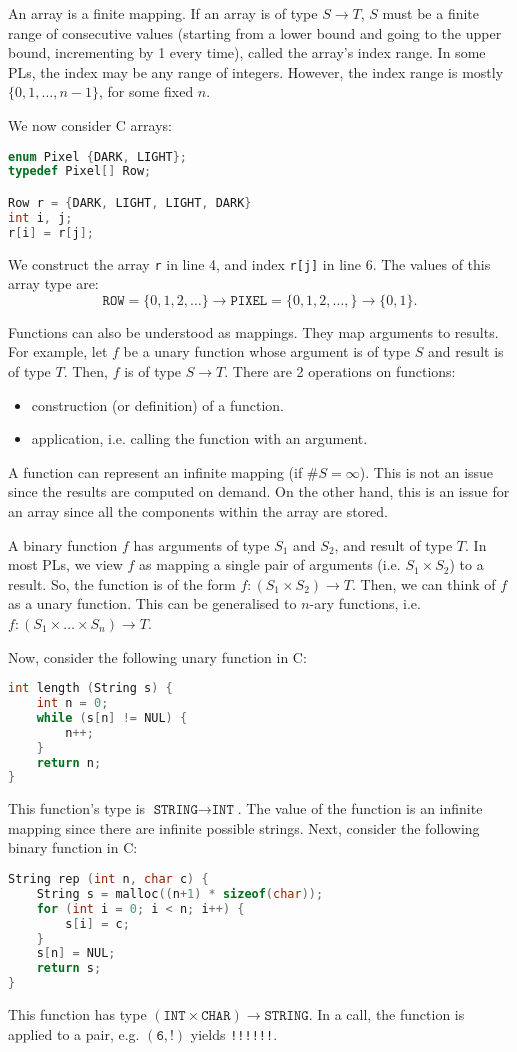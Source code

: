 \documentclass[a4paper, openany]{memoir}
\begin{document}
An array is a finite mapping. If an array is of type $S \to T$, $S$ must be a finite range of consecutive values (starting from a lower bound and going to the upper bound, incrementing by 1 every time), called the array's index range. In some PLs, the index may be any range of integers. However, the index range is mostly $\{0, 1, \dots, n-1\}$, for some fixed $n$.

We now consider C arrays:
\begin{lstlisting}[language=C]
enum Pixel {DARK, LIGHT};
typedef Pixel[] Row;

Row r = {DARK, LIGHT, LIGHT, DARK}
int i, j;
r[i] = r[j];
\end{lstlisting}
We construct the array \texttt{r} in line 4, and index \texttt{r[j]} in line 6.
The values of this array type are: 
\[\texttt{ROW} = \{0, 1, 2, \dots\} \to \texttt{PIXEL} = \{0, 1, 2, \dots, \} \to \{0, 1\}.\]

Functions can also be understood as mappings. They map arguments to results. For example, let $f$ be a unary function whose argument is of type $S$ and result is of type $T$. Then, $f$ is of type $S \to T$. There are 2 operations on functions:
\begin{itemize}
    \item construction (or definition) of a function.
    \item application, i.e. calling the function with an argument.
\end{itemize}
A function can represent an infinite mapping (if $\# S = \infty$). This is not an issue since the results are computed on demand. On the other hand, this is an issue for an array since all the components within the array are stored.

A binary function $f$ has arguments of type $S_1$ and $S_2$, and result of type $T$. In most PLs, we view $f$ as mapping a single pair of arguments (i.e. $S_1 \times S_2$) to a result. So, the function is of the form $f: (S_1 \times S_2) \to T$. Then, we can think of $f$ as a unary function. This can be generalised to $n$-ary functions, i.e. $f: (S_1 \times \dots \times S_n) \to T$.

Now, consider the following unary function in C:
\begin{lstlisting}[language=C]
int length (String s) {
    int n = 0;
    while (s[n] != NUL) {
        n++;
    }
    return n;
}
\end{lstlisting}
This function's type is $\texttt{STRING} \to \texttt{INT}$. The value of the function is an infinite mapping since there are infinite possible strings. Next, consider the following binary function in C:
\begin{lstlisting}[language=C]
String rep (int n, char c) {
    String s = malloc((n+1) * sizeof(char));
    for (int i = 0; i < n; i++) {
        s[i] = c;
    }
    s[n] = NUL;
    return s;
}
\end{lstlisting}
This function has type $(\texttt{INT} \times \texttt{CHAR}) \to \texttt{STRING}$. In a call, the function is applied to a pair, e.g. $(\texttt{6}, \texttt{!})$ yields \texttt{!!!!!!}.
\end{document}
